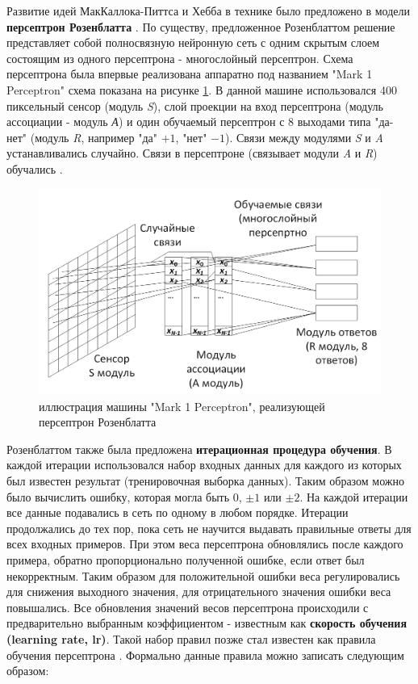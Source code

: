 \documentclass[12pt]{article}
\begin{document}
\begin{sloppypar}
Развитие идей МакКаллока-Питтса и Хебба в технике было предложено в модели \textbf{персептрон Розенблатта}
\cite{rosenblatt1958perceptron, rosenblatt1957perceptron}. 
По существу, предложенное Розенблаттом решение представляет собой полносвязную нейронную сеть с одним скрытым слоем состоящим из одного персептрона - многослойный персептрон. Схема персептрона была впервые реализована аппаратно под названием "Mark 1 Perceptron" схема показана на рисунке \ref{ch1:fig:Rosenblatt}. В данной машине использовался 400 пиксельный сенсор (модуль \textit{S}),  слой проекции на вход персептрона (модуль ассоциации - модуль \textit{А}) и один обучаемый персептрон с 8 выходами типа "да-нет" (модуль \textit{R}, например "да" $+1$, "нет" $-1$). Связи между модулями \textit{S} и \textit{A} устанавливались случайно. Связи в персептроне (связывает модули \textit{A} и \textit{R}) обучались
\cite{hay1960mark}.

\begin{figure}
	\begin{center}
		\includegraphics[width=0.7\linewidth]{./figuresch1/Rosenblatt.png}
		\caption{иллюстрация машины "Mark 1 Perceptron", реализующей персептрон Розенблатта}		
		\label{ch1:fig:Rosenblatt}
	\end{center}
\end{figure}

Розенблаттом также была предложена \textbf{итерационная процедура обучения}. В каждой итерации использовался набор  входных данных для каждого из которых был известен результат (тренировочная выборка данных). Таким образом можно было вычислить ошибку, которая могла быть  $0$, $\pm 1$ или $\pm 2$. На каждой итерации все данные подавались в сеть по одному в любом порядке. Итерации продолжались до тех пор, пока сеть не научится выдавать правильные ответы для всех входных примеров. При этом веса персептрона обновлялись после каждого примера, обратно пропорционально полученной ошибке, если ответ был некорректным. 
Таким образом для положительной ошибки веса регулировались для снижения выходного значения, для отрицательного значения ошибки веса повышались. Все обновления значений весов персептрона происходили с предварительно выбранным коэффициентом - известным как \textbf{скорость обучения (learning rate, lr)}. Такой набор правил позже стал известен как правила обучения персептрона \cite{kelleher2019deep}. 
Формально данные правила можно записать следующим образом:


\end{sloppypar}
\end{document}
